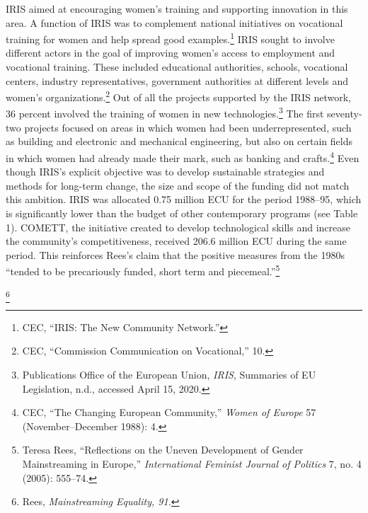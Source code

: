 \documentclass{tufte-handout}
\begin{document}
IRIS aimed at encouraging women's training and supporting innovation in
this area. A function of IRIS was to complement national initiatives on
vocational training for women and help spread good examples.\footnote{CEC,
  ``IRIS: The New Community Network.''} IRIS sought to involve different
actors in the goal of improving women's access to employment and
vocational training. These included educational authorities, schools,
vocational centers, industry representatives, government authorities at
different levels and women's organizations.\footnote{CEC, ``Commission
  Communication on Vocational,'' 10.} Out of all the projects supported
by the IRIS network, 36 percent involved the training of women in new
technologies.\footnote{Publications Office of the European Union,
  \emph{IRIS}, Summaries of EU Legislation, n.d., accessed April 15,
  2020.} The first seventy-two projects focused on areas in which women
had been underrepresented, such as building and electronic and
mechanical engineering, but also on certain fields in which women had
already made their mark, such as banking and crafts.\footnote{CEC, ``The
  Changing European Community,'' \emph{Women of Europe} 57
  (November--December 1988): 4.} Even though IRIS's explicit objective
was to develop sustainable strategies and methods for long-term change,
the size and scope of the funding did not match this ambition. IRIS was
allocated 0.75 million ECU for the period 1988--95, which is
significantly lower than the budget of other contemporary programs (see
Table 1). COMETT, the initiative created to develop technological skills
and increase the community's competitiveness, received 206.6 million ECU
during the same period. This reinforces Rees's claim that the positive
measures from the 1980s ``tended to be precariously funded, short term
and piecemeal.''\footnote{Teresa Rees, ``Reflections on the Uneven
  Development of Gender Mainstreaming in Europe,'' \emph{International
  Feminist Journal of Politics} 7, no. 4 (2005): 555--74.}


\newpage

\footnote{Rees, \emph{Mainstreaming Equality, 91.}}


\vspace*{1em}
\end{document}
